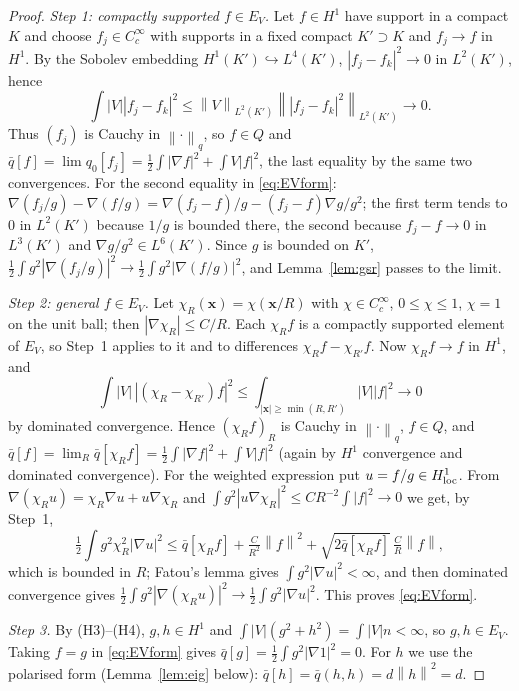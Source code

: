 \documentclass[11pt,a4paper]{article}
\theoremstyle{plain}
\theoremstyle{definition}
\theoremstyle{remark}
\newcommand{\norm}[1]{\left\|#1\right\|}
\begin{document}
\begin{proof}
\emph{Step 1: compactly supported $f\in E_V$.} Let $f\in H^1$ have support in a compact $K$ and choose $f_j\in C_c^\infty$ with supports in a fixed compact $K'\supset K$ and $f_j\to f$ in $H^1$. By the Sobolev embedding $H^1(K')\hookrightarrow L^4(K')$, $|f_j-f_k|^2\to0$ in $L^2(K')$, hence
\[
\int|V||f_j-f_k|^2\le\norm V_{L^2(K')}\norm{|f_j-f_k|^2}_{L^2(K')}\to0 .
\]
Thus $(f_j)$ is Cauchy in $\norm\cdot_q$, so $f\in Q$ and $\bar q[f]=\lim q_0[f_j]=\tfrac12\int|\nabla f|^2+\int V|f|^2$, the last equality by the same two convergences. For the second equality in \eqref{eq:EVform}: $\nabla(f_j/g)-\nabla(f/g)=\nabla(f_j-f)/g-(f_j-f)\nabla g/g^2$; the first term tends to $0$ in $L^2(K')$ because $1/g$ is bounded there, the second because $f_j-f\to0$ in $L^3(K')$ and $\nabla g/g^2\in L^6(K')$. Since $g$ is bounded on $K'$, $\tfrac12\int g^2|\nabla(f_j/g)|^2\to\tfrac12\int g^2|\nabla(f/g)|^2$, and Lemma~\ref{lem:gsr} passes to the limit.

\emph{Step 2: general $f\in E_V$.} Let $\chi_R(\mathbf x)=\chi(\mathbf x/R)$ with $\chi\in C_c^\infty$, $0\le\chi\le1$, $\chi=1$ on the unit ball; then $|\nabla\chi_R|\le C/R$. Each $\chi_Rf$ is a compactly supported element of $E_V$, so Step~1 applies to it and to differences $\chi_Rf-\chi_{R'}f$. Now $\chi_Rf\to f$ in $H^1$, and
\[
\int|V|\,|(\chi_R-\chi_{R'})f|^2\le\int_{|\mathbf x|\ge\min(R,R')}|V||f|^2\to0
\]
by dominated convergence. Hence $(\chi_Rf)_R$ is Cauchy in $\norm\cdot_q$, $f\in Q$, and $\bar q[f]=\lim_R\bar q[\chi_Rf]=\tfrac12\int|\nabla f|^2+\int V|f|^2$ (again by $H^1$ convergence and dominated convergence). For the weighted expression put $u=f/g\in H^1_{\rm loc}$. From $\nabla(\chi_Ru)=\chi_R\nabla u+u\nabla\chi_R$ and $\int g^2|u\nabla\chi_R|^2\le C R^{-2}\int|f|^2\to0$ we get, by Step~1,
\[
\tfrac12\int g^2\chi_R^2|\nabla u|^2\le\bar q[\chi_Rf]+\tfrac{C}{R^2}\norm f^2+\sqrt{2\bar q[\chi_Rf]}\,\tfrac{C}{R}\norm f ,
\]
which is bounded in $R$; Fatou's lemma gives $\int g^2|\nabla u|^2<\infty$, and then dominated convergence gives $\tfrac12\int g^2|\nabla(\chi_Ru)|^2\to\tfrac12\int g^2|\nabla u|^2$. This proves \eqref{eq:EVform}.

\emph{Step 3.} By (H3)--(H4), $g,h\in H^1$ and $\int|V|(g^2+h^2)=\int|V|n<\infty$, so $g,h\in E_V$. Taking $f=g$ in \eqref{eq:EVform} gives $\bar q[g]=\tfrac12\int g^2|\nabla 1|^2=0$. For $h$ we use the polarised form (Lemma~\ref{lem:eig} below): $\bar q[h]=\bar q(h,h)=d\norm h^2=d$.
\end{proof}
\end{document}
